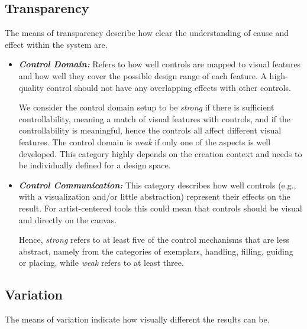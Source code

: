 \subsection{Transparency}
\label{subsec:taxo_transparency}

The means of transparency describe how clear the understanding of cause and effect within the system are.
\begin{itemize}
    \item \textit{\textbf{Control Domain:}} Refers to how well controls are mapped to visual features and how well they cover the possible design range of each feature. A high-quality control should not have any overlapping effects with other controls.

    We consider the control domain setup to be \textit{strong} if there is sufficient controllability, meaning a match of visual features with controls, and if the controllability is meaningful, hence the controls all affect different visual features. The control domain is \textit{weak} if only one of the aspects is well developed. This category highly depends on the creation context and needs to be individually defined for a design space.

    \item \textit{\textbf{Control Communication:}} This category describes how well controls (e.g., with a visualization and/or little abstraction) represent their effects on the result. For artist-centered tools this could mean that controls should be visual and directly on the canvas.

    Hence, \textit{strong} refers to at least five of the control mechanisms that are less abstract, namely from the categories of exemplars, handling, filling, guiding or placing, while \textit{weak} refers to at least three.
\end{itemize}


\subsection{Variation}
\label{subsec:taxo_variation}
The means of variation indicate how visually different the results can be.

